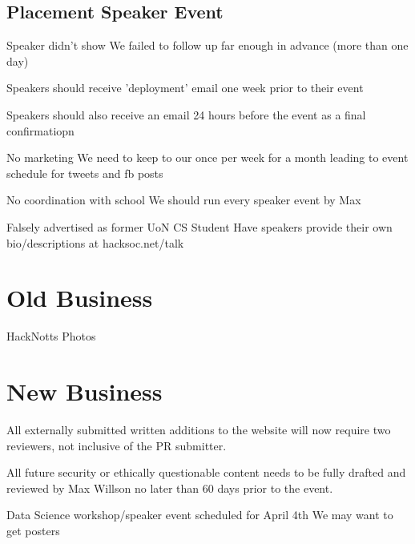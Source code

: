 \documentclass[11pt,hacksoc]{meetingmins}
\begin{document}
\subsection{Placement Speaker Event}
\begin{hiddensubitems}
	\item
	Speaker didn't show
		\subitem
		We failed to follow up far enough in advance (more than one day)
		
		\subitem
		Speakers should receive 'deployment' email one week prior to their event
		
		\subitem
		Speakers should also receive an email 24 hours before the event as a final confirmatiopn
	
	\item
	No marketing
		\subitem
		We need to keep to our once per week for a month leading to event schedule for tweets and fb posts
	
	\item
	No coordination with school
		\subitem
		We should run every speaker event by Max
	
	\item
	Falsely advertised as former UoN CS Student
		\subitem
		Have speakers provide their own bio/descriptions at hacksoc.net/talk
	
		
	
\end{hiddensubitems}

\section{Old Business}
\begin{items}
	\item
	HackNotts Photos
		\subitem
	
\end{items}

\section{New Business}
\begin{items}
	\item
	All externally submitted written additions to the website will now require two reviewers, not inclusive of the PR submitter.
	
	\item
	All future security or ethically questionable content needs to be fully drafted and reviewed by Max Willson no later than 60 days prior to the event.
	
	\item
	Data Science workshop/speaker event scheduled for April 4th
		\subitem
		We may want to get posters
		
	\item
	
\end{items}

\vspace{1em}
\end{document}
